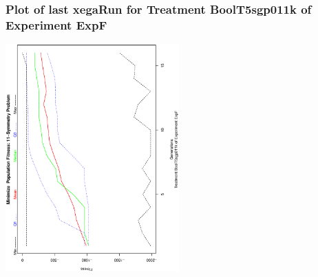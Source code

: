  \begin{frame}
 \frametitle{ Plot of last xegaRun for Treatment BoolT5sgp011k of Experiment ExpF }
 \begin{center}
\includegraphics[width=0.5\textwidth, angle=-90]
{ExpFPlotPopStatsFigure009.eps}
 \end{center}
 \label{templateReport/ExpFPlotPopStatsFigure009.eps}  
 \end{frame}

